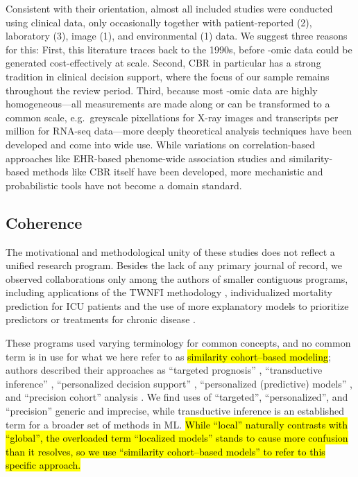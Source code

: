 \documentclass[sn-mathphys,Numbered,pdflatex]{sn-jnl}
\theoremstyle{remark}
\theoremstyle{definition}
\begin{document}
Consistent with their orientation, almost all included studies were
conducted using clinical data, only occasionally together with
patient-reported (2), laboratory (3), image (1), and environmental (1)
data. We suggest three reasons for this: First, this literature traces
back to the 1990s, before -omic data could be generated cost-effectively
at scale. Second, CBR in particular has a strong tradition in clinical
decision support, where the focus of our sample remains throughout the
review period. Third, because most -omic data are highly
homogeneous---all measurements are made along or can be transformed to a
common scale, e.g.~greyscale pixellations for X-ray images and
transcripts per million for RNA-seq data---more deeply theoretical
analysis techniques have been developed and come into wide use. While
variations on correlation-based approaches like EHR-based phenome-wide
association studies and similarity-based methods like CBR itself have
been developed, more mechanistic and probabilistic tools have not become
a domain standard.

\subsection{Coherence}\label{coherence}

The motivational and methodological unity of these studies does not
reflect a unified research program. Besides the lack of any primary
journal of record, we observed collaborations only among the authors of
smaller contiguous programs, including applications of the TWNFI
methodology \citep{Song2006, Verma2015}, individualized mortality
prediction for ICU patients \citep{Lee2015, Lee2017} and the use of more
explanatory models to prioritize predictors or treatments for chronic
disease \citep{Ng2015, Tang2021, Ng2021}.

These programs used varying terminology for common concepts, and no
common term is in use for what we here refer to as
\hl{similarity cohort--based modeling}; authors described their
approaches as ``targeted prognosis'' \citep{Mariuzzi1997},
``transductive inference'' \citep{Song2006}, ``personalized decision
support'' \citep{Lee2015}, ``personalized (predictive) models''
\citetext{\citealp[in contrast to ``local
models'']{Liang2015}; \citealp{Ng2015}; \citealp{Wang2019}; \citealp{Ma2020}; \citealp{Liu2022}; \citealp{Doborjeh2022}},
and ``precision cohort'' analysis \citep{Wang2019, Tang2021, Ng2021}. We
find uses of ``targeted'', ``personalized'', and ``precision'' generic
and imprecise, while transductive inference is an established term for a
broader set of methods in ML.
\hl{While ``local'' naturally contrasts with ``global'', the overloaded term ``localized models'' stands to cause more confusion than it resolves, so we use ``similarity cohort--based models'' to refer to this specific approach.}
\end{document}
